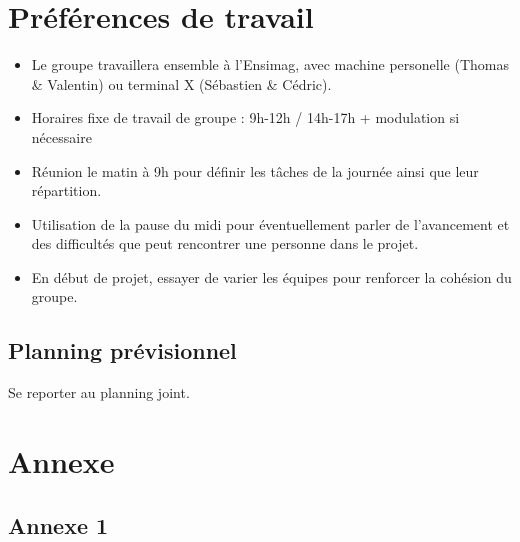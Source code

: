 \documentclass[11pt]{article}
\begin{document}
\section{Préférences de travail}
\begin{itemize}
\item Le groupe travaillera ensemble à l'Ensimag, avec machine personelle (Thomas \& Valentin) ou terminal X (Sébastien \& Cédric).
\item Horaires fixe de travail de groupe : 9h-12h / 14h-17h + modulation si nécessaire
\item Réunion le matin à 9h pour définir les tâches de la journée ainsi que leur répartition.
\item Utilisation de la pause du midi pour éventuellement parler de l'avancement et des difficultés que peut rencontrer une personne dans le projet. 
\item En début de projet, essayer de varier les équipes pour renforcer la cohésion du groupe.
\end{itemize}


\newpage

\subsection*{Planning prévisionnel}
Se reporter au planning joint.

\section{Annexe}
\subsection*{Annexe 1}
\end{document}
